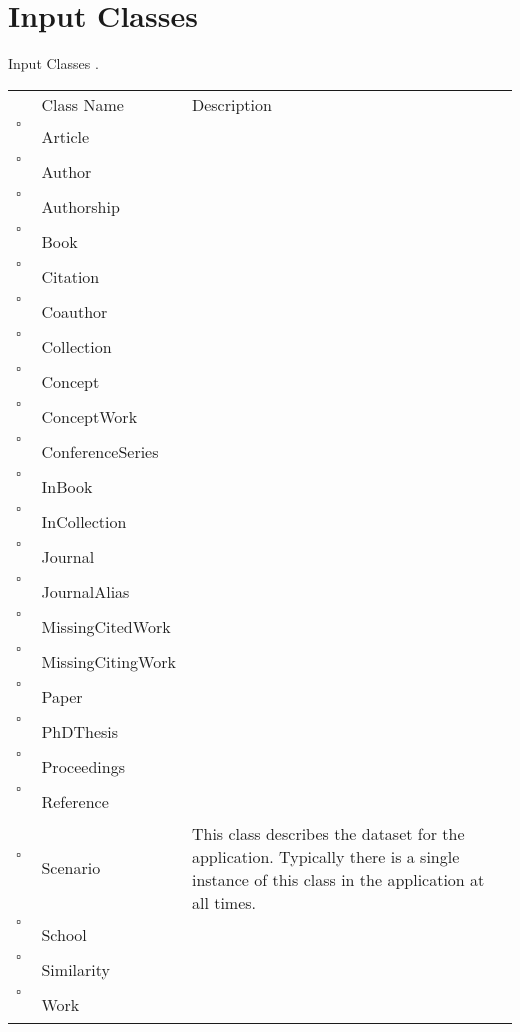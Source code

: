 \chapter{Input Classes}
Input Classes     .
\begin{longtable}{llp{8cm}}
& Class Name & Description \\
$\square$\ & Article &  \\
$\square$\ & Author &  \\
$\square$\ & Authorship &  \\
$\square$\ & Book &  \\
$\square$\ & Citation &  \\
$\square$\ & Coauthor &  \\
$\square$\ & Collection &  \\
$\square$\ & Concept &  \\
$\square$\ & ConceptWork &  \\
$\square$\ & ConferenceSeries &  \\
$\square$\ & InBook &  \\
$\square$\ & InCollection &  \\
$\square$\ & Journal &  \\
$\square$\ & JournalAlias &  \\
$\square$\ & MissingCitedWork &  \\
$\square$\ & MissingCitingWork &  \\
$\square$\ & Paper &  \\
$\square$\ & PhDThesis &  \\
$\square$\ & Proceedings &  \\
$\square$\ & Reference &  \\
$\square$\ & Scenario & This class describes the dataset for the application. Typically there is a single instance of this class in the application at all times. \\
$\square$\ & School &  \\
$\square$\ & Similarity &  \\
$\square$\ & Work &  \\
\end{longtable}
